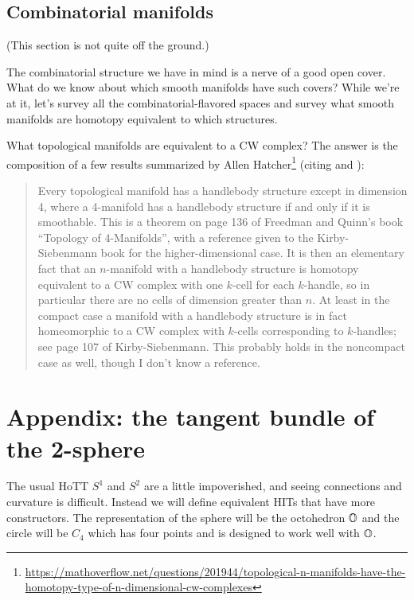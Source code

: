 \documentclass[12pt]{article}
\begin{document}
\subsection{Combinatorial manifolds}

(This section is not quite off the ground.)

The combinatorial structure we have in mind is a nerve of a good open cover. What do we know about which smooth manifolds have such covers? While we're at it, let's survey all the combinatorial-flavored spaces and survey what smooth manifolds are homotopy equivalent to which structures.

What topological manifolds are equivalent to a CW complex? The answer is the composition of a few results summarized by Allen Hatcher\footnote{\url{https://mathoverflow.net/questions/201944/topological-n-manifolds-have-the-homotopy-type-of-n-dimensional-cw-complexes}} (citing \cite{kirby_siebenmann} and \cite{freedman_quinn}):

\begin{quote}
Every topological manifold has a handlebody structure except in dimension 4, where a 4-manifold has a handlebody structure if and only if it is smoothable. This is a theorem on page 136 of Freedman and Quinn's book ``Topology of 4-Manifolds'', with a reference given to the Kirby-Siebenmann book for the higher-dimensional case. It is then an elementary fact that an \( n \)-manifold with a handlebody structure is homotopy equivalent to a CW complex with one \( k \)-cell for each \( k \)-handle, so in particular there are no cells of dimension greater than \( n \). At least in the compact case a manifold with a handlebody structure is in fact homeomorphic to a CW complex with \( k \)-cells corresponding to \( k \)-handles; see page 107 of Kirby-Siebenmann. This probably holds in the noncompact case as well, though I don't know a reference.
\end{quote}

\section{Appendix: the tangent bundle of the 2-sphere}

The usual HoTT \( S^1 \) and \( S^2 \) are a little impoverished, and seeing connections and curvature is difficult. Instead we will define equivalent HITs that have more constructors. The representation of the sphere will be the octohedron \( \mathbb{O} \) and the circle will be \( C_4 \) which has four points and is designed to work well with \( \mathbb{O} \).
\end{document}
